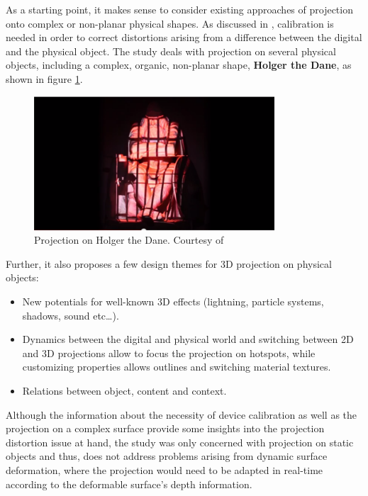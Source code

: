 \documentclass[]{article}
\begin{document}
As a starting point, it makes sense to consider existing approaches of projection onto complex or non-planar physical shapes. As discussed in \cite{daalsgard11}, calibration is needed in order to correct distortions arising from a difference between the digital and the physical object. The study deals with projection on several physical objects, including a complex, organic, non-planar shape, \textbf{Holger the Dane}, as shown in figure \ref{fig:holger}.

\begin{figure}[hbtp]
    \centering
    \includegraphics[width=0.8\textwidth]{figures/HolgerTheDane.PNG}
    \caption{Projection on Holger the Dane. Courtesy of \cite{daalsgard11}}
    \label{fig:holger}
\end{figure}

Further, it also proposes a few design themes for 3D projection on physical objects:
\begin{itemize}
\item New potentials for well-known 3D effects (lightning, particle systems, shadows, sound etc…).
\item Dynamics between the digital and physical world and switching between 2D and 3D projections allow to focus the projection on hotspots, while customizing properties allows outlines and switching material textures.
\item Relations between object, content and context.
\end{itemize}

Although the information about the necessity of device calibration as well as the projection on a complex surface provide some insights into the projection distortion issue at hand, the study was only concerned with projection on static objects and thus, does not address problems arising from dynamic surface deformation, where the projection would need to be adapted in real-time according to the deformable surface's depth information.\\
\end{document}
